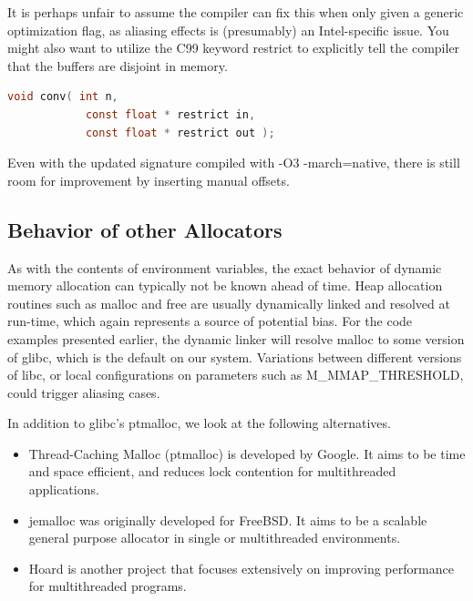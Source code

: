 \documentclass[a4paper,10pt,twocolumn,twoside]{article}
\begin{document}
It is perhaps unfair to assume the compiler can fix this when only given a generic optimization flag, as aliasing effects is (presumably) an Intel-specific issue.
You might also want to utilize the C99 keyword restrict to explicitly tell the compiler that the buffers are disjoint in memory.

\begin{lstlisting}[language=C]
void conv( int n,
            const float * restrict in,
            const float * restrict out );
\end{lstlisting}

Even with the updated signature compiled with -O3 -march=native, there is still room for improvement by inserting manual offsets.


\subsection{Behavior of other Allocators}
As with the contents of environment variables, the exact behavior of dynamic memory allocation can typically not be known ahead of time.
Heap allocation routines such as malloc and free are usually dynamically linked and resolved at run-time, which again represents a source of potential bias.
For the code examples presented earlier, the dynamic linker will resolve malloc to some version of glibc, which is the default on our system.
Variations between different versions of libc, or local configurations on parameters such as M\_MMAP\_THRESHOLD, could trigger aliasing cases.

In addition to glibc's ptmalloc, we look at the following alternatives.
\begin{itemize}
 \item Thread-Caching Malloc (ptmalloc) is developed by Google. It aims to be time and space efficient, and reduces lock contention for multithreaded applications. \cite{TCMalloc}
 \item jemalloc was originally developed for FreeBSD. It aims to be a scalable general purpose allocator in single or multithreaded environments. \cite{JEMalloc}
 \item Hoard is another project that focuses extensively on improving performance for multithreaded programs. \cite{Berger:2000:Hoard}
\end{itemize}
\end{document}
